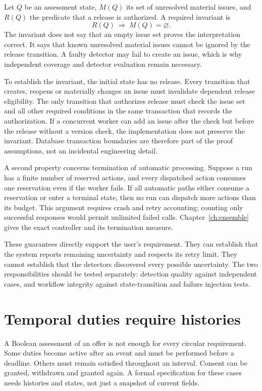 \documentclass[12pt,a4paper,oneside,openany]{book}
\begin{document}
Let $Q$ be an assessment state, $M(Q)$ its set of unresolved material issues,
and $R(Q)$ the predicate that a release is authorized. A required invariant is
\begin{equation}
 R(Q)\ \Longrightarrow\ M(Q)=\varnothing.
 \label{eq:no-open-release}
\end{equation}
The invariant does not say that an empty issue set proves the interpretation
correct. It says that known unresolved material issues cannot be ignored by
the release transition. A faulty detector may fail to create an issue, which
is why independent coverage and detector evaluation remain necessary.

To establish the invariant, the initial state has no release. Every transition
that creates, reopens or materially changes an issue must invalidate dependent
release eligibility. The only transition that authorizes release must check
the issue set and all other required conditions in the same transaction that
records the authorization. If a concurrent worker can add an issue after the
check but before the release without a version check, the implementation does
not preserve the invariant. Database transaction boundaries are therefore part
of the proof assumptions, not an incidental engineering detail.

A second property concerns termination of automatic processing. Suppose a run
has a finite number of reserved actions, and every dispatched action consumes
one reservation even if the worker fails. If all automatic paths either
consume a reservation or enter a terminal state, then no run can dispatch more
actions than its budget. This argument requires crash and retry accounting;
counting only successful responses would permit unlimited failed calls.
Chapter~\ref{ch:ensemble} gives the exact controller and its termination
measure.

These guarantees directly support the user's requirement. They can establish
that the system reports remaining uncertainty and respects its retry limit.
They cannot establish that the detectors discovered every possible uncertainty.
The two responsibilities should be tested separately: detection quality against
independent cases, and workflow integrity against state-transition and failure
injection tests.

\section{Temporal duties require histories}
\label{sec:proof-temporal}
A Boolean assessment of an offer is not enough for every circular requirement.
Some duties become active after an event and must be performed before a
deadline. Others must remain satisfied throughout an interval. Consent can be
granted, withdrawn and granted again. A formal specification for these cases
needs histories and states, not just a snapshot of current fields.
\end{document}
